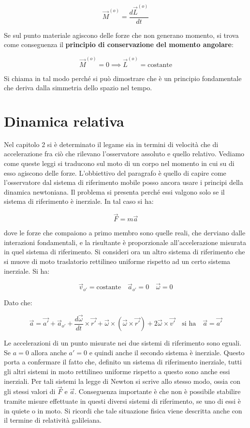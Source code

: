 \[
	\boxed{\vec{M}^{(o)}= \frac{d\vec{L}^{(o)}}{dt}}
\]

Se sul punto materiale agiscono delle forze che non generano momento, si trova come conseguenza il \textbf{principio di conservazione del momento angolare}:

\[
	\boxed{\vec{M}^{(o)}=0 \implies \vec{L}^{(o)}= \text{costante}}
\]

Si chiama in tal modo perché si può dimostrare che è un principio fondamentale che deriva dalla simmetria dello spazio nel tempo.

\section{Dinamica relativa}

Nel capitolo 2 si è determinato il legame sia in termini di velocità che di accelerazione fra ciò che rilevano l'osservatore assoluto e quello relativo. Vediamo come queste leggi si traducono sul moto di un corpo nel momento in cui su di esso agiscono delle forze. L'obbiettivo del paragrafo è quello di capire come l'osservatore dal sistema di riferimento mobile posso ancora usare i principi della dinamica newtoniana.
Il problema si presenta perché essi valgono solo se il sistema di riferimento è inerziale. In tal caso si ha:

\[
	\vec{F}=m\vec{a}
\]

dove le forze che compaiono a primo membro sono quelle reali, che derviano dalle interazioni fondamentali, e la risultante è proporzionale all'accelerazione misurata in quel sistema di riferimento. Si consideri ora un altro sistema di riferimento che si muove di moto traslatorio rettilineo uniforme rispetto ad un certo sistema inerziale. Si ha:

\[
	\vec{v}_{o'}=\text{costante} \quad \vec{a}_{o'}=0 \quad \vec{\omega}=0
\]

Dato che:

\[
	\vec{a}=\vec{a'}+\vec{a}_{o'}+\frac{d\vec{\omega}}{dt} \times \vec{r'}+\vec{\omega}\times (\vec{\omega} \times \vec{r'})+2\vec{\omega} \times \vec{v'} \quad \text{si ha} \quad \vec{a}=\vec{a'}
\]

Le accelerazioni di un punto misurate nei due sistemi di riferimento sono eguali. Se $a=0$ allora anche $a'=0$ e quindi anche il secondo sistema è inerziale. Questo porta a confermare il fatto che, definito un sistema di riferimento inerziale, tutti gli altri sistemi in moto rettilineo uniforme rispetto a questo sono anche essi inerziali. Per tali sistemi la legge di Newton si scrive allo stesso modo, ossia con gli stessi valori di $\vec{F}$ e $\vec{a}$. Conseguenza importante è che non è possibile stabilire tramite misure effettuate in questi diversi sistemi di riferimento, se uno di essi è in quiete o in moto. Si ricordi che tale situazione fisica viene descritta anche con il termine di relatività galileiana.

